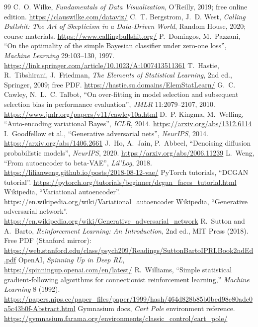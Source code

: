 \begin{thebibliography}{99}
 C.~O. Wilke, \emph{Fundamentals of Data Visualization}, O'Reilly, 2019; free online edition. \url{https://clauswilke.com/dataviz/}
 C.~T. Bergstrom, J.~D. West, \emph{Calling Bullshit: The Art of Skepticism in a Data-Driven World}, Random House, 2020; course materials. \url{https://www.callingbullshit.org/}
 P.~Domingos, M.~Pazzani, ``On the optimality of the simple Bayesian classifier under zero-one loss'', \emph{Machine Learning} 29:103--130, 1997. \url{https://link.springer.com/article/10.1023/A:1007413511361}
 T.~Hastie, R.~Tibshirani, J.~Friedman, \emph{The Elements of Statistical Learning}, 2nd ed., Springer, 2009; free PDF. \url{https://hastie.su.domains/ElemStatLearn/}
 G.~C. Cawley, N.~L.~C. Talbot, ``On over-fitting in model selection and subsequent selection bias in performance evaluation'', \emph{JMLR} 11:2079--2107, 2010. \url{https://www.jmlr.org/papers/v11/cawley10a.html}
 D.~P. Kingma, M.~Welling, ``Auto-encoding variational Bayes'', \emph{ICLR}, 2014. \url{https://arxiv.org/abs/1312.6114}
 I.~Goodfellow et al., ``Generative adversarial nets'', \emph{NeurIPS}, 2014. \url{https://arxiv.org/abs/1406.2661}
 J.~Ho, A.~Jain, P.~Abbeel, ``Denoising diffusion probabilistic models'', \emph{NeurIPS}, 2020. \url{https://arxiv.org/abs/2006.11239}
 L.~Weng, ``From autoencoder to beta-VAE'', \emph{Lil'Log}, 2018. \url{https://lilianweng.github.io/posts/2018-08-12-vae/}
 PyTorch tutorials, ``DCGAN tutorial''. \url{https://pytorch.org/tutorials/beginner/dcgan_faces_tutorial.html}
 Wikipedia, ``Variational autoencoder''. \url{https://en.wikipedia.org/wiki/Variational_autoencoder}
 Wikipedia, ``Generative adversarial network''. \url{https://en.wikipedia.org/wiki/Generative_adversarial_network}
 R.~Sutton and A.~Barto, \emph{Reinforcement Learning: An Introduction}, 2nd ed., MIT Press (2018). Free PDF (Stanford mirror): \url{https://web.stanford.edu/class/psych209/Readings/SuttonBartoIPRLBook2ndEd.pdf}
 OpenAI, \emph{Spinning Up in Deep RL}, \url{https://spinningup.openai.com/en/latest/}
 R.~Williams, ``Simple statistical gradient-following algorithms for connectionist reinforcement learning,'' \emph{Machine Learning} 8 (1992). \url{https://papers.nips.cc/paper_files/paper/1999/hash/464d828b85b0bed98e80ade0a5c43b0f-Abstract.html}
 Gymnasium docs, \emph{Cart Pole} environment reference. \url{https://gymnasium.farama.org/environments/classic_control/cart_pole/}

\end{thebibliography}
